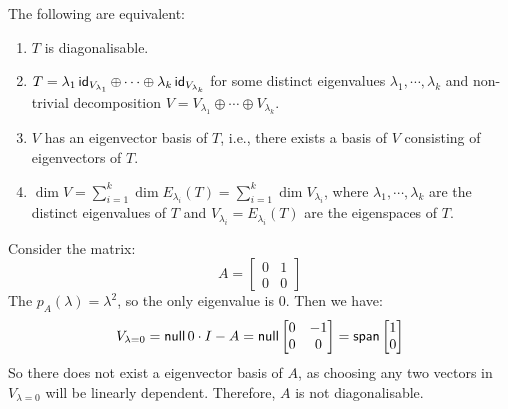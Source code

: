 \begin{proposition}
  The following are equivalent:
  \begin{enumerate}
    \item $T$ is diagonalisable.
    \item $T = \lambda_1 \operatorname{\text{\normalfont\sffamily id}}_{V_{\lambda_1}} \oplus \cdots \oplus \lambda_k \operatorname{\text{\normalfont\sffamily id}}_{V_{\lambda_k}}$ for some distinct eigenvalues $\lambda_1, \cdots, \lambda_k$ and non-trivial decomposition $V = V_{\lambda_1} \oplus \cdots \oplus V_{\lambda_k}$.
    \item $V$ has an eigenvector basis of $T$, i.e., there exists a basis of $V$ consisting of eigenvectors of $T$.
    \item $\dim V = \sum_{i = 1}^k \dim E_{\lambda_i} (T) = \sum_{i = 1}^k \dim V_{\lambda_i}$, where $\lambda_1, \cdots, \lambda_k$ are the distinct eigenvalues of $T$ and $V_{\lambda_i} = E_{\lambda_i} (T)$ are the eigenspaces of $T$.
  \end{enumerate}
\end{proposition}

\begin{example}
  Consider the matrix:
  \[
    A = \begin{bmatrix}
      0 & 1 \\
      0 & 0
    \end{bmatrix}
  \]
  The $p_A (\lambda) = \lambda^2$, so the only eigenvalue is $0$. Then we have:
  \[
    V_{\lambda = 0} = \operatorname{\text{\normalfont\sffamily null}}{0 \cdot I - A} = \operatorname{\text{\normalfont\sffamily null}} \begin{bmatrix}
      0 & -1 \\
      0 & 0
    \end{bmatrix} = \operatorname{\text{\normalfont\sffamily span}} \begin{bmatrix}
      1 \\
      0
    \end{bmatrix}
  \]
  So there does not exist a eigenvector basis of $A$, as choosing any two vectors in $V_{\lambda = 0}$ will be linearly dependent. Therefore, $A$ is not diagonalisable.
\end{example}

